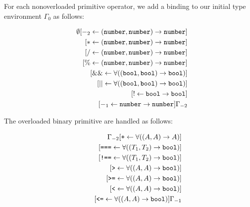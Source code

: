 
For each nonoverloaded primitive operator, we add a binding to our initial
type environment $\Gamma_0$ as follows:

\begin{eqnarray*}
& &
       \emptyset[ -_2 \leftarrow  (\texttt{number}, \texttt{number}) \rightarrow \texttt{number}]\\
&& \hspace{2mm} [ * \leftarrow  (\texttt{number}, \texttt{number}) \rightarrow \texttt{number}]\\
&& \hspace{2mm} [ / \leftarrow  (\texttt{number}, \texttt{number}) \rightarrow \texttt{number}]\\
&& \hspace{2mm} [ \% \leftarrow (\texttt{number}, \texttt{number}) \rightarrow \texttt{number}]\\
&& \hspace{2mm} [ \&\& \leftarrow \forall((\texttt{bool}, \texttt{bool}) \rightarrow \texttt{bool})]\\
&& \hspace{2mm} [ || \leftarrow   \forall((\texttt{bool}, \texttt{bool}) \rightarrow \texttt{bool})]\\
&& \hspace{2mm} [ ! \leftarrow \texttt{bool} \rightarrow \texttt{bool}]\\
&& \hspace{2mm} [ -_1 \leftarrow \texttt{number} \rightarrow \texttt{number}]\Gamma_{-2}
\end{eqnarray*}

The overloaded binary primitive are handled as follows:

\begin{eqnarray*}
 & &
      \Gamma_{-2}
                 [ \texttt{+} \leftarrow \forall((A, A) \rightarrow A)] \\
&& \hspace{6mm}  [ \texttt{===} \leftarrow \forall((T_1, T_2) \rightarrow \texttt{bool})] \\
&& \hspace{6mm}  [ \texttt{!==} \leftarrow \forall((T_1, T_2) \rightarrow \texttt{bool})] \\
&& \hspace{6mm}  [ \texttt{>} \leftarrow \forall((A, A) \rightarrow \texttt{bool})]\\
&& \hspace{6mm}  [ \texttt{>=} \leftarrow \forall((A, A) \rightarrow \texttt{bool})]\\
&& \hspace{6mm}  [ \texttt{<} \leftarrow \forall((A, A) \rightarrow \texttt{bool})] \\
&& \hspace{6mm}  [ \texttt{<=} \leftarrow \forall((A, A) \rightarrow \texttt{bool})]\Gamma_{-1}
\end{eqnarray*}

